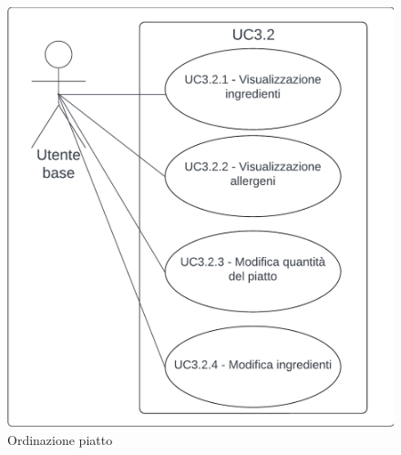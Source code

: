 \begin{figure}[H]
    \centering
    \includegraphics[scale=0.3]{ucd/UCD3.2_finale.png}
    \caption{Ordinazione piatto}
\end{figure}

